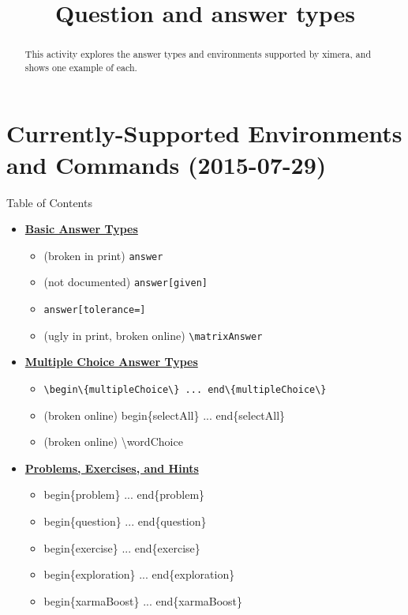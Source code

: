 \documentclass{ximera}
\title{Question and answer types}
\begin{document}
\begin{abstract}
  This activity explores the answer types and environments supported by ximera, and shows one example of each.
\end{abstract}

\maketitle

\section{Currently-Supported Environments and Commands (2015-07-29)}

\begin{remark} Table of Contents

\begin{itemize}
\item \hyperref[BasicAnswerType]{\textbf{Basic Answer Types}}
  \begin{itemize}
    \item (broken in print) \verb!answer!
    \item (not documented) \verb!answer[given]!
    \item \verb!answer[tolerance=]!
    \item (ugly in print, broken online) \verb!\matrixAnswer!
  \end{itemize}
\item \hyperref[MCAnswerType]{\textbf{Multiple Choice Answer Types}}
  \begin{itemize}
    \item \verb!\begin\{multipleChoice\} ... end\{multipleChoice\}!
    \item (broken online) begin\{selectAll\} ... end\{selectAll\}
    \item (broken online) \textbackslash wordChoice
  \end{itemize}    
\item \hyperref[ProblemContainers]{\textbf{Problems, Exercises, and Hints}}
  \begin{itemize}
    \item begin\{problem\} ... end\{problem\}
    \item begin\{question\} ... end\{question\}
    \item begin\{exercise\} ... end\{exercise\}
    \item begin\{exploration\} ... end\{exploration\}
    \item begin\{xarmaBoost\} ... end\{xarmaBoost\}

\end{itemize}
\end{itemize}
\end{remark}
\end{document}
